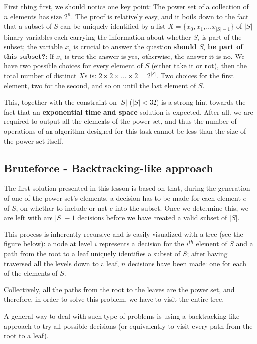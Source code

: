 First thing first, we should notice one key point: The power set of a collection of $n$ elements has size $2^n$. The proof  is relatively easy, and it boils down to the fact that a subset of $S$ can be uniquely identified by a list $X=\{x_0,x_1,\ldots x_{|S|-1}\}$ of $|S|$ binary variables each carrying the information about whether $S_i$ is part of the subset; the variable $x_i$ is crucial to answer the question \textbf{should $S_i$ be part of this subset?}: If $x_i$ is true the answer is yes, otherwise, the answer it is no.
We have two possible choices for every element of $S$ (either take it or not), then the total number of distinct $X$s  is: $2 \times 2 \times \ldots \times 2 = 2^{|S|}$. Two choices for the first element, two for the second, and so
on until the last element of $S$.
  
This, together with the constraint on $|S|$ ($|S| < 32)$ is a strong hint towards the fact that an \textbf{exponential time and space} solution is expected.
After all, we are required to output all the elements of the power set, and thus the number of operations of an algorithm designed for this task cannot be less than the size of the power set itself. 



\subsection{Bruteforce - Backtracking-like approach}

The first solution presented in this lesson is based on that,  during the generation of
one of the power set's elements, a decision has to be made for each element $e$ of $S$, on whether to include or not $e$ into the subset.
Once we determine this, we are left with are $|S|-1$ decisions
before we have created a valid subset of $|S|$.

This process is inherently recursive and is easily visualized with a tree (see the figure below): a node at level $i$
represents a decision for the $i^{th}$ element of $S$ and a path from the root to a leaf uniquely
identifies a subset of $S$; after having traversed all the levels down to a leaf, $n$ decisions have been made: 
one for each of the elements of $S$. 

Collectively, all the paths from the root to the leaves are the power set, and therefore, in
order to solve this problem, we have to visit the entire tree.


A general way to deal with such type of problems is using a backtracking-like approach to try all possible
decisions (or equivalently to visit every path from the root to a leaf).

